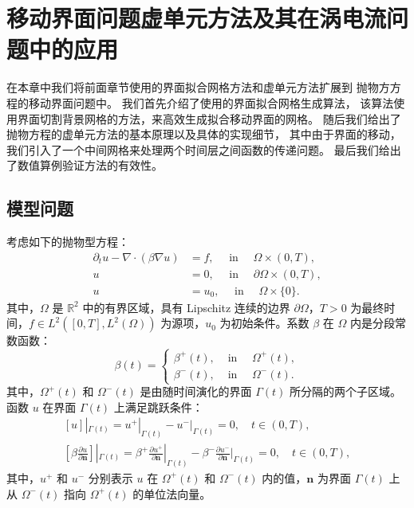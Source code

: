 \chapter{移动界面问题虚单元方法及其在涡电流问题中的应用}
在本章中我们将前面章节使用的界面拟合网格方法和虚单元方法扩展到
抛物方方程的移动界面问题中。
我们首先介绍了使用的界面拟合网格生成算法，
该算法使用界面切割背景网格的方法，来高效生成拟合移动界面的网格。
随后我们给出了抛物方程的虚单元方法的基本原理以及具体的实现细节，
其中由于界面的移动，我们引入了一个中间网格来处理两个时间层之间函数的传递问题。
最后我们给出了数值算例验证方法的有效性。

\section{模型问题}
考虑如下的抛物型方程：
\begin{equation}
\label{parabolic}
\begin{aligned}
    \partial_t u - \nabla \cdot (\beta \nabla u) & = f, \quad \text{ in } \quad
    \Omega \times (0, T),\\
    u & = 0, \quad \text{ in } \quad \partial \Omega \times (0, T),\\
    u & = u_0, \quad \text{ in } \quad \Omega \times \{0\}.
\end{aligned}
\end{equation}
其中，$\Omega$ 是 $\mathbb{R}^2$ 中的有界区域，具有 Lipschitz 连续的边界
$\partial \Omega$，$T > 0$ 为最终时间，$f \in L^2([0, T], L^2(\Omega))$ 为源项，$u_0$
为初始条件。系数 $\beta$ 在 $\Omega$ 内是分段常数函数：
$$
\beta(t) = 
\begin{cases}
    \beta^+(t), & \text{ in } \quad \Omega^+(t),\\
    \beta^-(t), & \text{ in } \quad \Omega^-(t).
\end{cases}
$$
其中，$\Omega^+(t)$ 和 $\Omega^-(t)$ 是由随时间演化的界面 $\Gamma(t)$ 所分隔的两个子区域。函数 $u$ 在界面 $\Gamma(t)$ 上满足跳跃条件：
\begin{equation}
\begin{aligned}
    [u]|_{\Gamma(t)} = u^+|_{\Gamma(t)} - u^-|_{\Gamma(t)} = 0, \quad t\in (0, T),\\
    [\beta \frac{\partial u}{\partial \boldsymbol{n}}]|_{\Gamma(t)} =
    \beta^+\frac{\partial u^+}{\partial \boldsymbol{n}}|_{\Gamma(t)} 
    - 
    \beta^-\frac{\partial u^-}{\partial \boldsymbol{n}}|_{\Gamma(t)} = 0, \quad t\in (0, T),
\end{aligned}
\end{equation}
其中，$u^+$ 和 $u^-$ 分别表示 $u$ 在 $\Omega^+(t)$ 和 $\Omega^-(t)$
内的值，$\boldsymbol{n}$ 为界面 $\Gamma(t)$ 上从 $\Omega^-(t)$ 指向 $\Omega^+(t)$ 的单位法向量。

